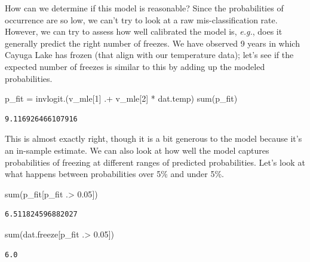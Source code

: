 \documentclass[
  letterpaper,
  DIV=11,
  numbers=noendperiod]{scrartcl}
\newenvironment{Shaded}{\begin{snugshade}}{\end{snugshade}}
\newcommand{\FloatTok}[1]{\textcolor[rgb]{0.68,0.00,0.00}{#1}}
\newcommand{\FunctionTok}[1]{\textcolor[rgb]{0.28,0.35,0.67}{#1}}
\newcommand{\NormalTok}[1]{\textcolor[rgb]{0.00,0.23,0.31}{#1}}
\newcommand{\OperatorTok}[1]{\textcolor[rgb]{0.37,0.37,0.37}{#1}}
\begin{document}
How can we determine if this model is reasonable? Since the
probabilities of occurrence are so low, we can't try to look at a raw
mis-classification rate. However, we can try to assess how well
calibrated the model is, \emph{e.g.}, does it generally predict the
right number of freezes. We have observed 9 years in which Cayuga Lake
has frozen (that align with our temperature data); let's see if the
expected number of freezes is similar to this by adding up the modeled
probabilities.

\begin{Shaded}
\begin{Highlighting}[]
\NormalTok{p\_fit }\OperatorTok{=} \FunctionTok{invlogit}\NormalTok{.(v\_mle[}\FloatTok{1}\NormalTok{] }\OperatorTok{.+}\NormalTok{ v\_mle[}\FloatTok{2}\NormalTok{] }\OperatorTok{*}\NormalTok{ dat.temp)}
\FunctionTok{sum}\NormalTok{(p\_fit)}
\end{Highlighting}
\end{Shaded}

\begin{verbatim}
9.116926466107916
\end{verbatim}

This is almost exactly right, though it is a bit generous to the model
because it's an in-sample estimate. We can also look at how well the
model captures probabilities of freezing at different ranges of
predicted probabilities. Let's look at what happens between
probabilities over 5\% and under 5\%.

\begin{Shaded}
\begin{Highlighting}[]
\FunctionTok{sum}\NormalTok{(p\_fit[p\_fit }\OperatorTok{.\textgreater{}} \FloatTok{0.05}\NormalTok{])}
\end{Highlighting}
\end{Shaded}

\begin{verbatim}
6.511824596882027
\end{verbatim}

\begin{Shaded}
\begin{Highlighting}[]
\FunctionTok{sum}\NormalTok{(dat.freeze[p\_fit }\OperatorTok{.\textgreater{}} \FloatTok{0.05}\NormalTok{])}
\end{Highlighting}
\end{Shaded}

\begin{verbatim}
6.0
\end{verbatim}
\end{document}
